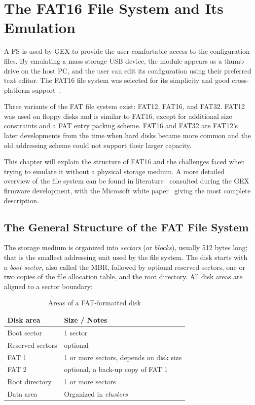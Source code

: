 \chapter{The FAT16 File System and Its Emulation} \label{sec:fat16}

A \gls{FS} is used by GEX to provide the user comfortable access to the configuration files. By emulating a mass storage \gls{USB} device, the module appears as a thumb drive on the host \gls{PC}, and the user can edit its configuration using their preferred text editor. The FAT16 file system was selected for its simplicity and good cross-platform support~\cite{os-support-table}.

Three variants of the \gls{FAT} file system exist: FAT12, FAT16, and FAT32. FAT12 was used on floppy disks and is similar to FAT16, except for additional size constraints and a \gls{FAT} entry packing scheme. FAT16 and FAT32 are FAT12's later developments from the time when hard disks became more common and the old addressing scheme could not support their larger capacity.

This chapter will explain the structure of FAT16 and the challenges faced when trying to emulate it without a physical storage medium. A more detailed overview of the file system can be found in literature~\cite{ms-fat,fat16-brainy,fat16-maverick,fat16-phobos,fat-whitepaper} consulted during the GEX firmware development, with the Microsoft white paper~\cite{fat-whitepaper} giving the most complete description.

\section{The General Structure of the FAT File System}

The storage medium is organized into \textit{sectors} (or \textit{blocks}), usually 512 bytes long; that is the smallest addressing unit used by the file system. The disk starts with a \textit{boot sector}, also called the \gls{MBR}, followed by optional reserved sectors, one or two copies of the file allocation table, and the root directory. All disk areas are aligned to a sector boundary:

\begin{table}[H]
	\centering
	\begin{tabular}{ll}
		\toprule
		\textbf{Disk area} & \textbf{Size / Notes} \\
		\midrule
		Boot sector & 1 sector \\
		Reserved sectors & optional \\
		FAT 1 & 1 or more sectors, depends on disk size \\
		FAT 2 & optional, a back-up copy of FAT 1 \\
		Root directory & 1 or more sectors \\
		Data area & Organized in \textit{clusters} \\
		\bottomrule
	\end{tabular}
	\caption{\label{tab:fat16-disk-areas}Areas of a FAT-formatted disk}
\end{table}


